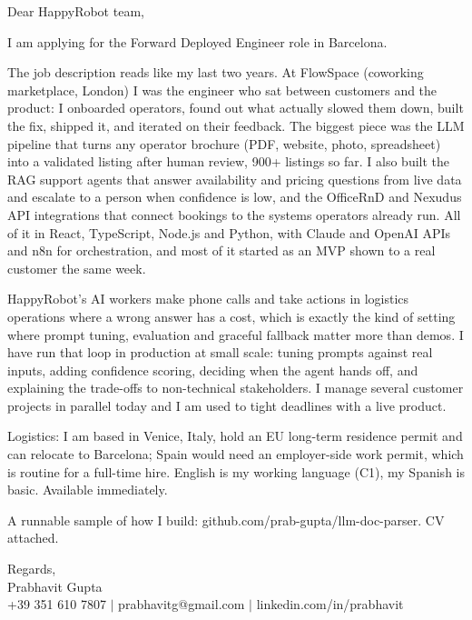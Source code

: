 \documentclass[a4paper,11pt]{article}
\begin{document}
Dear HappyRobot team,

I am applying for the Forward Deployed Engineer role in Barcelona.

The job description reads like my last two years. At FlowSpace (coworking marketplace, London) I was the engineer who sat between customers and the product: I onboarded operators, found out what actually slowed them down, built the fix, shipped it, and iterated on their feedback. The biggest piece was the LLM pipeline that turns any operator brochure (PDF, website, photo, spreadsheet) into a validated listing after human review, 900+ listings so far. I also built the RAG support agents that answer availability and pricing questions from live data and escalate to a person when confidence is low, and the OfficeRnD and Nexudus API integrations that connect bookings to the systems operators already run. All of it in React, TypeScript, Node.js and Python, with Claude and OpenAI APIs and n8n for orchestration, and most of it started as an MVP shown to a real customer the same week.

HappyRobot's AI workers make phone calls and take actions in logistics operations where a wrong answer has a cost, which is exactly the kind of setting where prompt tuning, evaluation and graceful fallback matter more than demos. I have run that loop in production at small scale: tuning prompts against real inputs, adding confidence scoring, deciding when the agent hands off, and explaining the trade-offs to non-technical stakeholders. I manage several customer projects in parallel today and I am used to tight deadlines with a live product.

Logistics: I am based in Venice, Italy, hold an EU long-term residence permit and can relocate to Barcelona; Spain would need an employer-side work permit, which is routine for a full-time hire. English is my working language (C1), my Spanish is basic. Available immediately.

A runnable sample of how I build: github.com/prab-gupta/llm-doc-parser. CV attached.

Regards,\\
Prabhavit Gupta\\
+39 351 610 7807 $\vert$ prabhavitg@gmail.com $\vert$ linkedin.com/in/prabhavit
\end{document}
